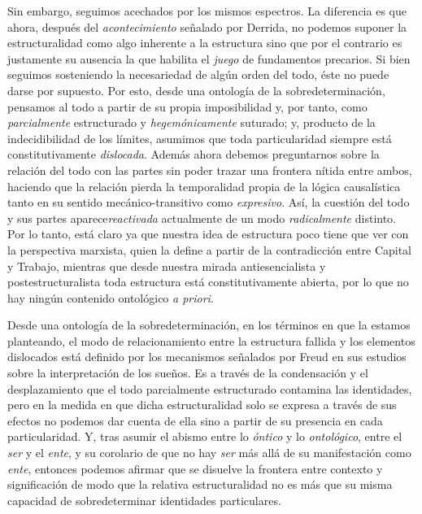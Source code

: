 \documentclass{book}
\begin{document}
Sin embargo, seguimos acechados por los mismos espectros. La diferencia
es que ahora, después del \emph{acontecimiento} señalado por Derrida, no
podemos suponer la estructuralidad como algo inherente a la estructura
sino que por el contrario es justamente su ausencia la que habilita el
\emph{juego} de fundamentos precarios. Si bien seguimos sosteniendo la
necesariedad de algún orden del todo, éste no puede darse por supuesto.
Por esto, desde una ontología de la sobredeterminación, pensamos al todo
a partir de su propia imposibilidad y, por tanto, como
\emph{parcialmente} estructurado y \emph{hegemónicamente} suturado; y,
producto de la indecidibilidad de los límites, asumimos que toda
particularidad siempre está constitutivamente \emph{dislocada}. Además
ahora debemos preguntarnos sobre la relación del todo con las partes sin
poder trazar una frontera nítida entre ambos, haciendo que la relación
pierda la temporalidad propia de la lógica causalística tanto en su
sentido mecánico-transitivo como \emph{expresivo}. Así, la cuestión del
todo y sus partes aparece\emph{reactivada} actualmente de un modo
\emph{radicalmente} distinto. Por lo tanto, está claro ya que nuestra
idea de estructura poco tiene que ver con la perspectiva marxista, quien
la define a partir de la contradicción entre Capital y Trabajo, mientras
que desde nuestra mirada antiesencialista y postestructuralista toda
estructura está constitutivamente abierta, por lo que no hay ningún
contenido ontológico \emph{a priori}.

Desde una ontología de la sobredeterminación, en los términos en que la
estamos planteando, el modo de relacionamiento entre la estructura
fallida y los elementos dislocados está definido por los mecanismos
señalados por Freud en sus estudios sobre la interpretación de los
sueños. Es a través de la condensación y el desplazamiento que el todo
parcialmente estructurado contamina las identidades, pero en la medida
en que dicha estructuralidad solo se expresa a través de sus efectos no
podemos dar cuenta de ella sino a partir de su presencia en cada
particularidad. Y, tras asumir el abismo entre lo \emph{óntico} y lo
\emph{ontológico}, entre el \emph{ser} y el \emph{ente}, y su corolario
de que no hay \emph{ser} más allá de su manifestación como \emph{ente},
entonces podemos afirmar que se disuelve la frontera entre contexto y
significación de modo que la relativa estructuralidad no es más que su
misma capacidad de sobredeterminar identidades particulares.
\end{document}
